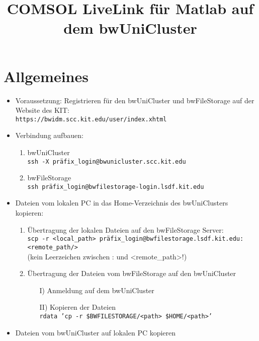 \documentclass[12pt]{scrartcl}%
\theoremstyle{nonumberplain}
\begin{document}
\author{}
\title{COMSOL LiveLink für Matlab auf dem bwUniCluster}
\date{} %

\maketitle %

\section{Allgemeines}

\begin{itemize}
\item Voraussetzung: Registrieren für den bwUniCluster und bwFileStorage auf der Website des KIT: \\
\texttt{https://bwidm.scc.kit.edu/user/index.xhtml}
\item Verbindung aufbauen:
\begin{enumerate}
\item bwUniCluster  \\ \texttt{ssh -X präfix\_login@bwunicluster.scc.kit.edu}
\item bwFileStorage \\ \texttt{ssh präfix\_login@bwfilestorage-login.lsdf.kit.edu}
\end{enumerate}
\item Dateien vom lokalen PC in das Home-Verzeichnis des bwUniClusters kopieren:
\begin{enumerate}
\item Übertragung der lokalen Dateien auf den bwFileStorage Server: \\ \texttt{scp -r <local\_path> präfix\_login@bwfilestorage.lsdf.kit.edu:<remote\_path/>} \\
(kein Leerzeichen zwischen : und <remote\_path>!)
\item Übertragung der Dateien vom bwFileStorage auf den bwUniCluster
\begin{enumerate}
\item[I)] Anmeldung auf dem bwUniCluster
\item[II)] Kopieren der Dateien \\ \texttt{rdata 'cp -r \$BWFILESTORAGE/<path> \$HOME/<path>'}
\end{enumerate}
\end{enumerate}
\item Dateien vom bwUniCluster auf lokalen PC kopieren
\begin{enumerate}

\end{enumerate}
\end{itemize}
\end{document}
